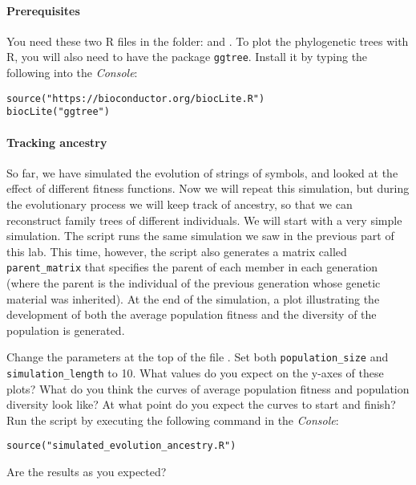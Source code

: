 \documentclass[a4paper, 9pt]{article}
\begin{document}
\paragraph{Prerequisites}
You need these two R files in the  folder:  and . To plot the phylogenetic trees with R, you will also need to have the package \texttt{ggtree}. Install it by typing the following into the \emph{Console}:
\begin{lstlisting}
source("https://bioconductor.org/biocLite.R")
biocLite("ggtree")
\end{lstlisting}

\paragraph{Tracking ancestry} So far, we have simulated the evolution of strings of symbols, and looked at the effect of different fitness functions. Now we will repeat this simulation, but during the evolutionary process we will keep track of ancestry, so that we can reconstruct family trees of different individuals. We will start with a very simple simulation. The script  runs the same simulation we saw in the previous part of this lab. This time, however, the script also generates a matrix called \texttt{parent\_matrix} that specifies the parent of each member in each generation (where the parent is the individual of the previous generation whose genetic material was inherited). At the end of the simulation, a plot illustrating the development of both the average population fitness and the diversity of the population is generated.

\begin{exercise}
\action Change the parameters at the top of the file . Set both \texttt{population\_size} and \texttt{simulation\_length} to 10. What values do you expect on the y-axes of these plots? What do you think the curves of average population fitness and population diversity look like? At what point do you expect the curves to start and finish?
\action Run the script by executing the following command in the \emph{Console}: 
\begin{lstlisting}
source("simulated_evolution_ancestry.R")
\end{lstlisting}
Are the results as you expected?
\end{exercise}
\end{document}
